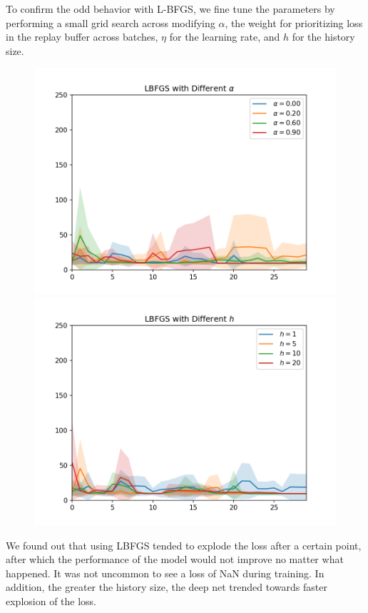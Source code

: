 \documentclass[11pt]{article}
\begin{document}
To confirm the odd behavior with \textsc{L-BFGS}, we fine tune the parameters by performing a small grid search across modifying $\alpha$, the weight for prioritizing loss in the replay buffer across batches, $\eta$ for the learning rate, and $h$ for the history size.

\begin{figure}[h!]
  \includegraphics[width=\linewidth]{assets/lbfgs_alpha.png}
\endminipage\hfill
{}
  \includegraphics[width=\linewidth]{assets/lbfgs_hist.png}
\endminipage\hfill
{}
\end{figure}

We found out that using LBFGS tended to explode the loss after a certain point, after which the performance of the model would not improve no matter what happened. It was not uncommon to see a loss of NaN during training.
In addition, the greater the history size, the deep net trended towards faster explosion of the loss.
\end{document}
